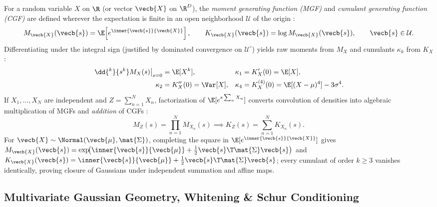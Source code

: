 \documentclass[../../../../master.tex]{subfiles}
\begin{document}
\begin{coremath}
For a random variable $X$ on $\R$ (or vector $\vecb{X}$ on $\R^D$), the \emph{moment generating function (MGF)} and \emph{cumulant generating function (CGF)} are defined wherever the expectation is finite in an open neighborhood $\mathcal{U}$ of the origin :
\begin{equation}\label{eq:probdist:mgf_cgf}
  M_{\vecb{X}}(\vecb{s}) = \E\!\left[e^{\inner{\vecb{s}}{\vecb{X}}}\right], \qquad
  K_{\vecb{X}}(\vecb{s}) = \log M_{\vecb{X}}(\vecb{s}), \qquad \vecb{s} \in \mathcal{U}.
\end{equation}
Differentiating under the integral sign (justified by dominated convergence on $\mathcal{U}^{\circ}$) yields raw moments from $M_X$ and cumulants $\kappa_k$ from $K_X$:
\begin{align}\label{eq:probdist:moments_cumulants}
  \left.\dd{^k}{s^k} M_X(s)\right|_{s=0} &= \E[X^k], &
  \kappa_1 &= K_X'(0) = \E[X], \\
  \kappa_2 &= K_X''(0) = \Var[X], &
  \kappa_4 &= K_X^{(4)}(0) = \E[(X-\mu)^4] - 3\sigma^4. \nonumber
\end{align}
If $X_1, \dots, X_N$ are independent and $Z = \sum_{n=1}^N X_n$, factorization of $\E[e^{s\sum_n X_n}]$ converts convolution of densities into algebraic multiplication of MGFs and \emph{addition} of CGFs :
\begin{equation}\label{eq:probdist:cgf_sum}
  M_Z(s) = \prod_{n=1}^N M_{X_n}(s) \implies K_Z(s) = \sum_{n=1}^N K_{X_n}(s).
\end{equation}
For $\vecb{X} \sim \Normal(\vecb{\mu}, \mat{\Sigma})$, completing the square in $\E[e^{\inner{\vecb{s}}{\vecb{X}}}]$ gives $M_{\vecb{X}}(\vecb{s}) = \exp\!\bigl(\inner{\vecb{s}}{\vecb{\mu}} + \tfrac{1}{2}\vecb{s}\T\mat{\Sigma}\vecb{s}\bigr)$ and $K_{\vecb{X}}(\vecb{s}) = \inner{\vecb{s}}{\vecb{\mu}} + \tfrac{1}{2}\vecb{s}\T\mat{\Sigma}\vecb{s}$; every cumulant of order $k \ge 3$ vanishes identically, proving closure of Gaussians under independent summation and affine maps.
\end{coremath}

\subsection{Multivariate Gaussian Geometry, Whitening \& Schur Conditioning}
\end{document}

